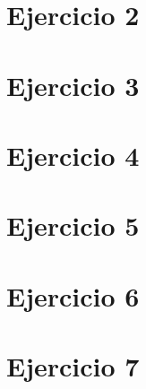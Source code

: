 \documentclass[11pt, spanish]{article}
\begin{document}
\section{Ejercicio 2}


\section{Ejercicio 3}



\section{Ejercicio 4}


\section{Ejercicio 5}



\section{Ejercicio 6}


\section{Ejercicio 7}
\end{document}
